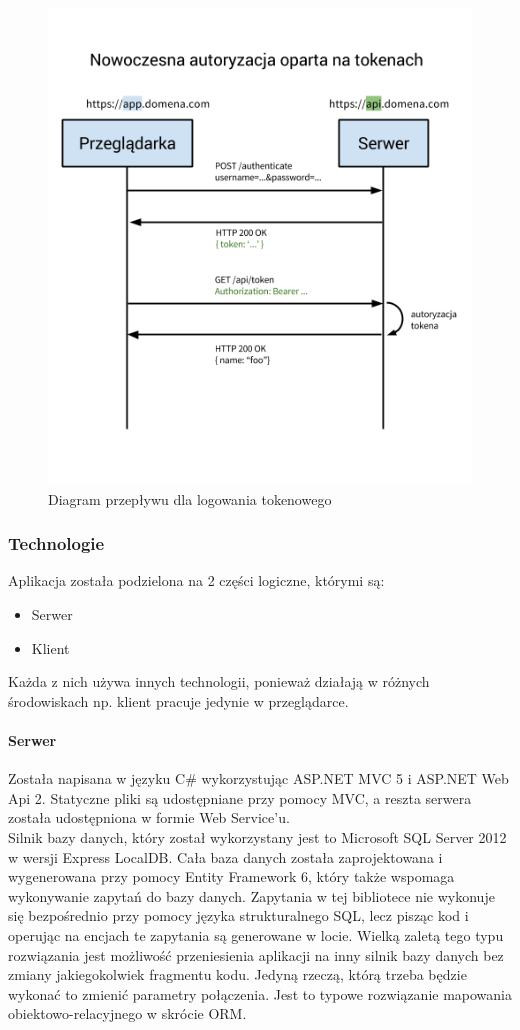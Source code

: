 \documentclass[10pt,titlepage]{article}
\begin{document}
\begin{figure}[H]
  \centering
  \includegraphics[scale=0.355]{images/tokenAuth2.png}
  \caption{Diagram przepływu dla logowania tokenowego}
\end{figure}
\subsubsection{Technologie}
Aplikacja została podzielona na 2 części logiczne, którymi są:
\begin{itemize}
  \item Serwer
  \item Klient
\end{itemize}
Każda z nich używa innych technologii, ponieważ działają w różnych środowiskach np. klient pracuje jedynie w przeglądarce.
\paragraph{Serwer}
Została napisana w języku C\# wykorzystując ASP.NET MVC 5 i ASP.NET Web Api 2. Statyczne pliki są udostępniane przy pomocy MVC, a reszta serwera została udostępniona w formie Web Service'u.\\ Silnik bazy danych, który został wykorzystany jest to Microsoft SQL Server 2012 w wersji Express LocalDB. Cała baza danych została zaprojektowana i wygenerowana przy pomocy Entity Framework 6, który także wspomaga wykonywanie zapytań do bazy danych. Zapytania w tej bibliotece nie wykonuje się bezpośrednio przy pomocy języka strukturalnego SQL, lecz pisząc kod i operując na encjach te zapytania są generowane w locie. Wielką zaletą tego typu rozwiązania jest możliwość przeniesienia aplikacji na inny silnik bazy danych bez zmiany jakiegokolwiek fragmentu kodu. Jedyną rzeczą, którą trzeba będzie wykonać to zmienić parametry połączenia. Jest to typowe rozwiązanie mapowania obiektowo-relacyjnego w skrócie ORM.
\end{document}
